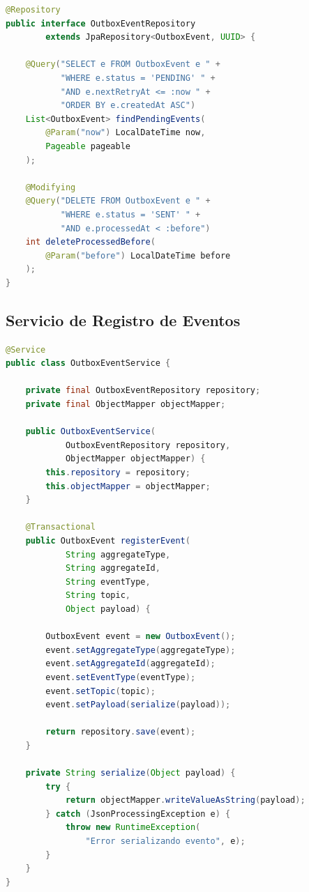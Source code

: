 \begin{lstlisting}[language=Java, caption={Repositorio JPA para consultar eventos pendientes.}]
@Repository
public interface OutboxEventRepository
        extends JpaRepository<OutboxEvent, UUID> {

    @Query("SELECT e FROM OutboxEvent e " +
           "WHERE e.status = 'PENDING' " +
           "AND e.nextRetryAt <= :now " +
           "ORDER BY e.createdAt ASC")
    List<OutboxEvent> findPendingEvents(
        @Param("now") LocalDateTime now,
        Pageable pageable
    );

    @Modifying
    @Query("DELETE FROM OutboxEvent e " +
           "WHERE e.status = 'SENT' " +
           "AND e.processedAt < :before")
    int deleteProcessedBefore(
        @Param("before") LocalDateTime before
    );
}
\end{lstlisting}

\subsection{Servicio de Registro de Eventos}

\begin{lstlisting}[language=Java, caption={Servicio para registrar eventos en la tabla Outbox.}]
@Service
public class OutboxEventService {

    private final OutboxEventRepository repository;
    private final ObjectMapper objectMapper;

    public OutboxEventService(
            OutboxEventRepository repository,
            ObjectMapper objectMapper) {
        this.repository = repository;
        this.objectMapper = objectMapper;
    }

    @Transactional
    public OutboxEvent registerEvent(
            String aggregateType,
            String aggregateId,
            String eventType,
            String topic,
            Object payload) {

        OutboxEvent event = new OutboxEvent();
        event.setAggregateType(aggregateType);
        event.setAggregateId(aggregateId);
        event.setEventType(eventType);
        event.setTopic(topic);
        event.setPayload(serialize(payload));

        return repository.save(event);
    }

    private String serialize(Object payload) {
        try {
            return objectMapper.writeValueAsString(payload);
        } catch (JsonProcessingException e) {
            throw new RuntimeException(
                "Error serializando evento", e);
        }
    }
}
\end{lstlisting}


